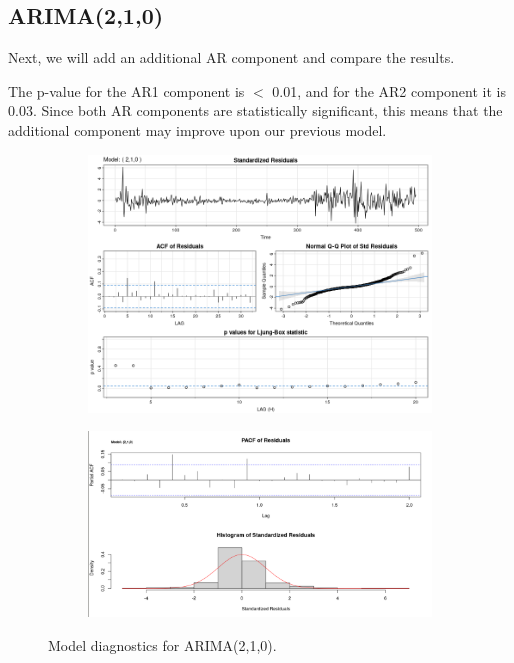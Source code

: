 \documentclass[12pt]{article}
\begin{document}
\newpage

\subsection{ARIMA(2,1,0)}
Next, we will add an additional AR component and compare the results.



The p-value for the AR1 component is $<$ 0.01, and for the AR2 component it is 0.03. Since both AR components are statistically significant, this means that the additional component may improve upon our previous model.

\newpage

\begin{figure}[ht]
\centering

\begin{subfigure}[b]{0.6\textwidth}
\centering
\includegraphics[width=1\textwidth]{images/arima_210.png}
\label{fig:sub1}
\end{subfigure}

\begin{subfigure}[b]{0.6\textwidth}
\centering
\includegraphics[width=1\textwidth]{images/arima_210_examine.png}
\label{fig:sub2}
\end{subfigure}

\caption{Model diagnostics for ARIMA(2,1,0).}
\label{fig:test}
\end{figure}
\newpage
\end{document}
